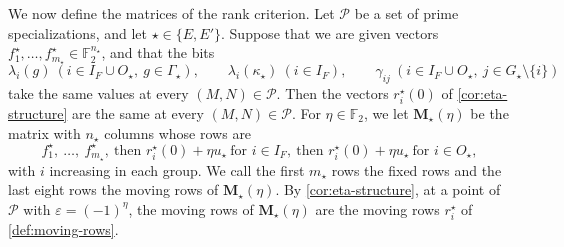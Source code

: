 \documentclass[12pt,oneside,openany]{book}
\theoremstyle{definition}
\theoremstyle{plain}
\numberwithin{equation}{chapter}
\theoremstyle{plain}
\theoremstyle{definition}
\theoremstyle{remark}
\newcommand{\F}{\mathbb F}
\newcommand{\cP}{\mathcal P}
\newcommand{\eps}{\varepsilon}
\begin{document}
We now define the matrices of the rank criterion. Let $\cP$ be a set of prime specializations, and let $\star\in\{E,E'\}$. Suppose that we are given vectors $f^\star_1,\dots,f^\star_{m_\star}\in\F_2^{n_\star}$, and that the bits
\begin{equation}\label{eq:constant-bits}
\lambda_i(g)\ (i\in I_F\cup O_\star,\ g\in\Gamma_\star),\qquad\lambda_i(\kappa_\star)\ (i\in I_F),\qquad\gamma_{ij}\ (i\in I_F\cup O_\star,\ j\in G_\star\setminus\{i\})
\end{equation}
take the same values at every $(M,N)\in\cP$. Then the vectors $r^\star_i(0)$ of \cref{cor:eta-structure} are the same at every $(M,N)\in\cP$. For $\eta\in\F_2$, we let $\mathbf M_\star(\eta)$ be the matrix with $n_\star$ columns whose rows are
\begin{equation}\label{eq:matrix-def}
f^\star_1,\ \dots,\ f^\star_{m_\star},\ \text{then }r^\star_i(0)+\eta u_\star\ \text{for }i\in I_F,\ \text{then }r^\star_i(0)+\eta u_\star\ \text{for }i\in O_\star,
\end{equation}
with $i$ increasing in each group. We call the first $m_\star$ rows the fixed rows and the last eight rows the moving rows of $\mathbf M_\star(\eta)$. By \cref{cor:eta-structure}, at a point of $\cP$ with $\eps=(-1)^\eta$, the moving rows of $\mathbf M_\star(\eta)$ are the moving rows $r^\star_i$ of \cref{def:moving-rows}.
\end{document}
